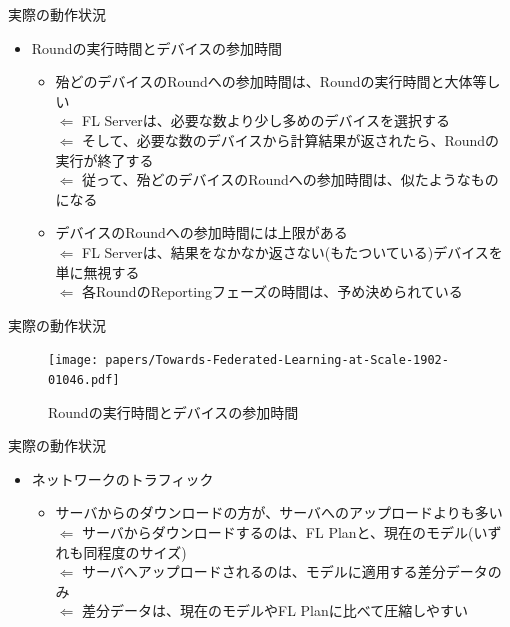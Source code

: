 \documentclass[dvipdfmx,notheorems,t]{beamer}
\begin{document}
\begin{frame}{実際の動作状況}

\begin{itemize}
	\item Roundの実行時間とデバイスの参加時間
	\begin{itemize}
		\item 殆どのデバイスのRoundへの参加時間は、Roundの実行時間と大体等しい \\
		$\Leftarrow$ FL Serverは、必要な数より少し多めのデバイスを選択する \\
		$\Leftarrow$ そして、必要な数のデバイスから計算結果が返されたら、Roundの実行が終了する \\
		$\Leftarrow$ 従って、殆どのデバイスのRoundへの参加時間は、似たようなものになる
		\newline
		
		\item デバイスのRoundへの参加時間には上限がある \\
		$\Leftarrow$ FL Serverは、結果をなかなか返さない(もたついている)デバイスを単に無視する \\
		$\Leftarrow$ 各RoundのReportingフェーズの時間は、予め決められている
	\end{itemize}
\end{itemize}

\end{frame}

\begin{frame}{実際の動作状況}

\begin{figure}
	\centering
	\texttt{[image: papers/Towards-Federated-Learning-at-Scale-1902-01046.pdf]}
	\caption{Roundの実行時間とデバイスの参加時間~\cite{1902.01046}}
	\label{fig:round-execution-time}
\end{figure}

\end{frame}

\begin{frame}{実際の動作状況}

\begin{itemize}
	\item ネットワークのトラフィック
	\begin{itemize}
		\item サーバからのダウンロードの方が、サーバへのアップロードよりも多い \\
		$\Leftarrow$ サーバからダウンロードするのは、FL Planと、現在のモデル(いずれも同程度のサイズ) \\
		$\Leftarrow$ サーバへアップロードされるのは、モデルに適用する差分データのみ \\
		$\Leftarrow$ 差分データは、現在のモデルやFL Planに比べて圧縮しやすい
	\end{itemize}
\end{itemize}

\end{frame}
\end{document}
